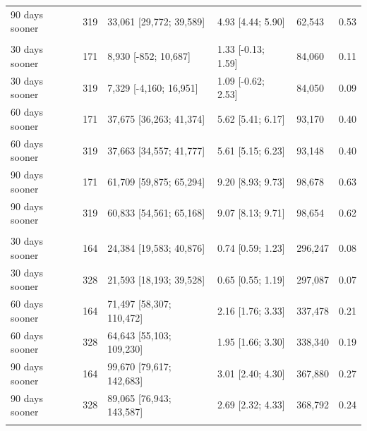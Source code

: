 \documentclass{article}
\begin{document}
\begin{table}
\begin{tabular}[t]{lrlllr}
\hspace{1em}90 days sooner & 319 & 33,061 [29,772; 39,589] & 4.93 [4.44; 5.90] & 62,543 & 0.53\\
\addlinespace[0.3em]
\multicolumn{6}{l}{\textbf{UK to Jan 2022}}\\
\hspace{1em}30 days sooner & 171 & 8,930 [-852; 10,687] & 1.33 [-0.13; 1.59] & 84,060 & 0.11\\
\hspace{1em}30 days sooner & 319 & 7,329 [-4,160; 16,951] & 1.09 [-0.62; 2.53] & 84,050 & 0.09\\
\hspace{1em}60 days sooner & 171 & 37,675 [36,263; 41,374] & 5.62 [5.41; 6.17] & 93,170 & 0.40\\
\hspace{1em}60 days sooner & 319 & 37,663 [34,557; 41,777] & 5.61 [5.15; 6.23] & 93,148 & 0.40\\
\hspace{1em}90 days sooner & 171 & 61,709 [59,875; 65,294] & 9.20 [8.93; 9.73] & 98,678 & 0.63\\
\hspace{1em}90 days sooner & 319 & 60,833 [54,561; 65,168] & 9.07 [8.13; 9.71] & 98,654 & 0.62\\
\addlinespace[0.3em]
\multicolumn{6}{l}{\textbf{US to April 2021}}\\
\hspace{1em}30 days sooner & 164 & 24,384 [19,583; 40,876] & 0.74 [0.59; 1.23] & 296,247 & 0.08\\
\hspace{1em}30 days sooner & 328 & 21,593 [18,193; 39,528] & 0.65 [0.55; 1.19] & 297,087 & 0.07\\
\hspace{1em}60 days sooner & 164 & 71,497 [58,307; 110,472] & 2.16 [1.76; 3.33] & 337,478 & 0.21\\
\hspace{1em}60 days sooner & 328 & 64,643 [55,103; 109,230] & 1.95 [1.66; 3.30] & 338,340 & 0.19\\
\hspace{1em}90 days sooner & 164 & 99,670 [79,617; 142,683] & 3.01 [2.40; 4.30] & 367,880 & 0.27\\
\hspace{1em}90 days sooner & 328 & 89,065 [76,943; 143,587] & 2.69 [2.32; 4.33] & 368,792 & 0.24\\
\addlinespace[0.3em]
\multicolumn{6}{l}{\textbf{US to July 2021}}\\

\end{tabular}
\end{table}
\end{document}
